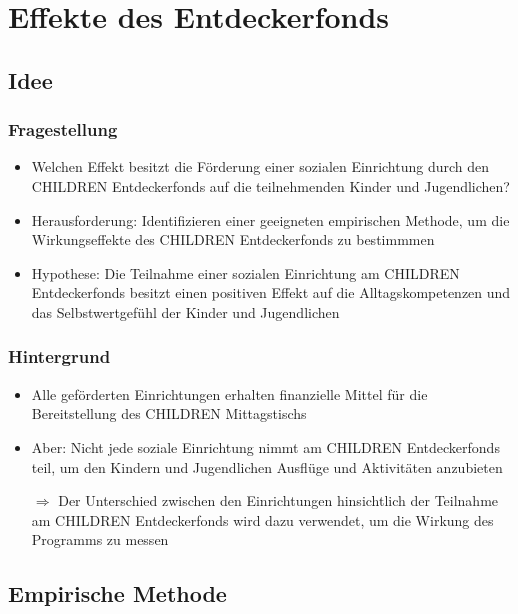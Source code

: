 \begin{frame}[fragile]
\begin{itemize}
\begin{frame}
\begin{itemize}
\begin{frame}
\end{frame}


\section{Effekte des Entdeckerfonds}

\subsection{Idee}

\begin{frame}[fragile]
\frametitle{Fragestellung}
\begin{itemize}
\item Welchen Effekt besitzt die Förderung einer sozialen Einrichtung durch den CHILDREN Entdeckerfonds auf die teilnehmenden Kinder und Jugendlichen?
\item Herausforderung: Identifizieren einer geeigneten empirischen Methode, um die Wirkungseffekte des CHILDREN Entdeckerfonds zu bestimmmen
\linebreak
\item Hypothese: Die Teilnahme einer sozialen Einrichtung am CHILDREN Entdeckerfonds besitzt einen positiven Effekt auf die Alltagskompetenzen und das Selbstwertgefühl der Kinder und Jugendlichen
\end{itemize}
\end{frame}


\begin{frame}[fragile]
\frametitle{Hintergrund}
\begin{itemize}
\item Alle geförderten Einrichtungen erhalten finanzielle Mittel für die Bereitstellung des CHILDREN Mittagstischs
\item Aber: Nicht jede soziale Einrichtung nimmt am CHILDREN Entdeckerfonds teil, um den Kindern und Jugendlichen Ausflüge und Aktivitäten anzubieten
\linebreak
\item [$\Rightarrow$] Der Unterschied zwischen den Einrichtungen hinsichtlich der Teilnahme am CHILDREN Entdeckerfonds wird dazu verwendet, um die Wirkung des Programms zu messen
\end{itemize}
\end{frame}

\subsection{Empirische Methode}


\end{itemize}
\end{frame}
\end{itemize}
\end{frame}
